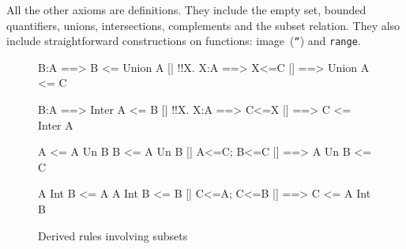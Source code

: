 All the other axioms are definitions.  They include the empty set, bounded
quantifiers, unions, intersections, complements and the subset relation.
They also include straightforward constructions on functions: image~({\tt``})
and \texttt{range}.


%
%
%
%
%
%


\begin{figure} \underscoreon
\begin{ttbox}
     B:A ==> B <= Union A
     [| !!X. X:A ==> X<=C |] ==> Union A <= C

     B:A ==> Inter A <= B
  [| !!X. X:A ==> C<=X |] ==> C <= Inter A

       A <= A Un B
       B <= A Un B
        [| A<=C;  B<=C |] ==> A Un B <= C

      A Int B <= A
      A Int B <= B
    [| C<=A;  C<=B |] ==> C <= A Int B
\end{ttbox}
\caption{Derived rules involving subsets} \label{hol-subset}
\end{figure}


